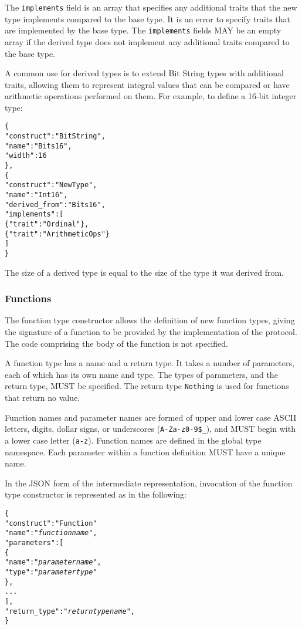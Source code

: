 \documentclass[10pt,twocolumn,a4paper]{article}
\newcommand{\code}[1]{\texttt{#1}}
\begin{document}
The \code{implements} field is an array that specifies any additional
traits that the new type implements compared to the base type. It is an
error to specify traits that are implemented by the base type.
The \code{implements} fields MAY be an empty array if the derived type
does not implement any additional traits compared to the base type.

A common use for derived types is to extend Bit String types with additional
traits, allowing them to represent integral values that can be compared or
have arithmetic operations performed on them. For example, to define a 16-bit
integer type:
\footnotesize
\begin{alltt}
  \{
    "construct"     : "BitString",
    "name"          : "Bits16",
    "width"         : 16
  \},
  \{
    "construct"     : "NewType",
    "name"          : "Int16",
    "derived\_from"  : "Bits16",
    "implements"    : [
      \{"trait" : "Ordinal"\},
      \{"trait" : "ArithmeticOps"\}
    ]
  \}
\end{alltt}
\normalsize

The size of a derived type is equal to the size of the type it was derived
from.

\subsubsection{Functions}
\label{sec:functions}

The function type constructor allows the definition of new function types,
giving the signature of a function to be provided by the implementation of
the protocol. The code comprising the body of the function is not specified. 

A function type has a name and a return type. It takes a number of
parameters, each of which has its own name and type. 
The types of parameters, and the return type, MUST be specified.
The return type \code{Nothing} is used for functions that return no value.

Function names and parameter names are formed of upper and lower case ASCII
letters, digits, dollar signs, or underscores (\code{A-Za-z0-9\$\_}), and
MUST begin with a lower case letter (\code{a-z}).
Function names are defined in the global type namespace.
Each parameter within a function definition MUST have a unique name.

In the JSON form of the intermediate representation, invocation of the
function type constructor is represented as in the following:
\footnotesize
\begin{alltt}
  \{
    "construct"    : "Function"
    "name"         : "\emph{function name}",
    "parameters"   : [
      \{
        "name" : "\emph{parameter name}",
        "type" : "\emph{parameter type}"
      \},
      ...
    ],
    "return\_type"  : "\emph{return type name}",
  \}
\end{alltt}
\normalsize
\end{document}
